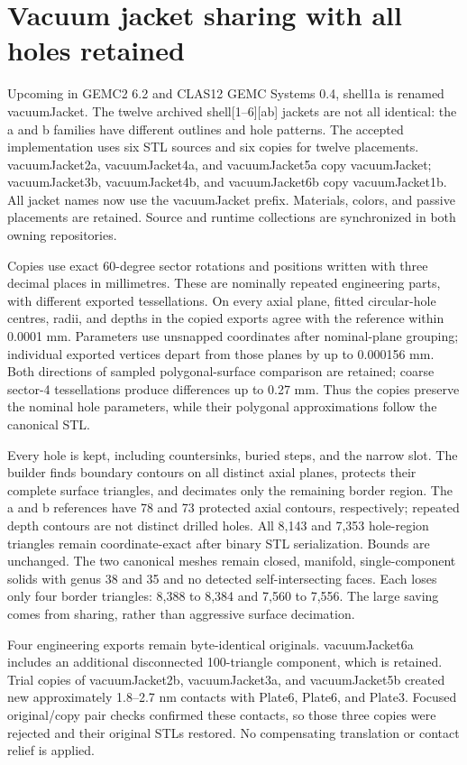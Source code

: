 \FloatBarrier
\section{Vacuum jacket sharing with all holes retained}
\label{sec:vacuum-jacket}

Upcoming in GEMC2 6.2 and CLAS12 GEMC Systems 0.4, shell1a is renamed vacuumJacket. The twelve archived
shell[1--6][ab] jackets are not all identical: the a and b families have different outlines and hole patterns.
The accepted implementation uses six STL sources and six copies for twelve placements. vacuumJacket2a,
vacuumJacket4a, and vacuumJacket5a copy vacuumJacket; vacuumJacket3b, vacuumJacket4b, and vacuumJacket6b copy
vacuumJacket1b. All jacket names now use the vacuumJacket prefix. Materials, colors, and passive placements
are retained. Source and runtime collections are synchronized in both owning repositories.

Copies use exact 60-degree sector rotations and positions written with three decimal places in millimetres.
These are nominally repeated engineering parts, with different exported tessellations. On every axial plane,
fitted circular-hole centres, radii, and depths in the copied exports agree with the reference within 0.0001
mm. Parameters use unsnapped coordinates after nominal-plane grouping; individual exported vertices depart
from those planes by up to 0.000156 mm. Both directions of sampled polygonal-surface comparison are retained;
coarse sector-4 tessellations produce differences up to 0.27 mm. Thus the copies preserve the nominal hole
parameters, while their polygonal approximations follow the canonical STL.

Every hole is kept, including countersinks, buried steps, and the narrow slot. The builder finds boundary
contours on all distinct axial planes, protects their complete surface triangles, and decimates only the
remaining border region. The a and b references have 78 and 73 protected axial contours, respectively;
repeated depth contours are not distinct drilled holes. All 8,143 and 7,353 hole-region triangles remain
coordinate-exact after binary STL serialization. Bounds are unchanged. The two canonical meshes remain closed,
manifold, single-component solids with genus 38 and 35 and no detected self-intersecting faces. Each loses
only four border triangles: 8,388 to 8,384 and 7,560 to 7,556. The large saving comes from sharing, rather
than aggressive surface decimation.

Four engineering exports remain byte-identical originals. vacuumJacket6a includes an additional disconnected
100-triangle component, which is retained. Trial copies of vacuumJacket2b, vacuumJacket3a, and vacuumJacket5b
created new approximately 1.8--2.7 nm contacts with Plate6, Plate6, and Plate3. Focused original/copy pair
checks confirmed these contacts, so those three copies were rejected and their original STLs restored. No
compensating translation or contact relief is applied.

